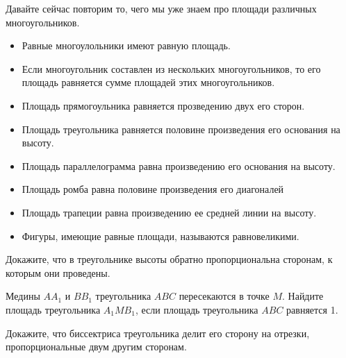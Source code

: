 Давайте сейчас повторим то, чего мы уже знаем про площади различных многоугольников.

\begin{itemize}
    \item Равные многоулольники имеют равную площадь.
    \item Если многоугольник составлен из нескольких многоугольников, то его площадь равняется сумме площадей этих многоугольников.
    \item Площадь прямогоульника равняется прозведению двух его сторон.
    \item Площадь треугольника равняется половине произведения его основания на высоту.
    \item Площадь параллелограмма равна произведению его основания на высоту.
    \item Площадь ромба равна половине произведения его диагоналей
    \item Площадь трапеции равна произведению ее средней линии на высоту.
    \item Фигуры, имеющие равные площади, называются равновеликими. 
\end{itemize}


\begin{example}
    Докажите, что в треугольнике высоты обратно пропорциональна сторонам, к которым они проведены.
\end{example}

\begin{example}
    Медины $AA_1$ и $BB_1$ треугольника $ABC$ пересекаются в точке $M$. Найдите площадь треугольника $A_1MB_1$, если площадь треугольника $ABC$ равняется 1.
\end{example}

\begin{example}
    Докажите, что биссектриса треугольника делит его сторону на отрезки, пропорциональные двум другим сторонам.
\end{example}
